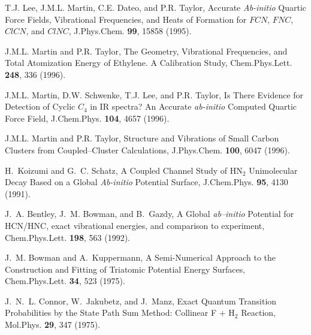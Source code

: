 \begin{thebibliography}{999}
T.J. Lee,
J.M.L. Martin, C.E. Dateo, and P.R. Taylor,
Accurate {\it Ab-initio} Quartic Force Fields,
Vibrational Frequencies, and Heats of Formation
for $FCN$, $FNC$, $ClCN$, and $ClNC$,
J.Phys.Chem. {\bf 99}, 15858 (1995).

J.M.L. Martin and P.R. Taylor,
The Geometry, Vibrational Frequencies, and Total Atomization
Energy of Ethylene. A Calibration Study,
Chem.Phys.Lett. {\bf 248}, 336 (1996).

J.M.L. Martin, D.W. Schwenke, T.J. Lee, and P.R. Taylor,
Is There Evidence for Detection of Cyclic $C_4$ in IR spectra?
An Accurate {\it ab-initio} Computed Quartic Force Field,
J.Chem.Phys. {\bf 104}, 4657 (1996).

J.M.L. Martin and P.R. Taylor,
Structure and Vibrations of Small Carbon Clusters from 
Coupled--Cluster Calculations,
J.Phys.Chem. {\bf 100}, 6047 (1996).






H.~Koizumi and G.~C. Schatz,
A Coupled Channel Study of HN$_2$ Unimolecular Decay Based on a
Global {\it Ab-initio} Potential Surface,
\newblock J.Chem.Phys. {\bf 95}, 4130 (1991).

J.~A. Bentley, J.~M. Bowman, and B.~Gazdy,
A Global {\it ab--initio} Potential for HCN/HNC,
exact vibrational energies, and comparison to experiment,
\newblock Chem.Phys.Lett. {\bf 198}, 563 (1992).

J.~M. Bowman and A.~Kuppermann,
A Semi-Numerical Approach to the Construction and Fitting of Triatomic 
Potential Energy Surfaces,
\newblock Chem.Phys.Lett. {\bf 34}, 523 (1975).

J.~N.~L. Connor, W.~Jakubetz, and J.~Manz,
Exact Quantum Transition Probabilities by the State Path Sum Method:
Collinear F + H$_2$ Reaction,
\newblock Mol.Phys. {\bf 29}, 347 (1975).


\end{thebibliography}
